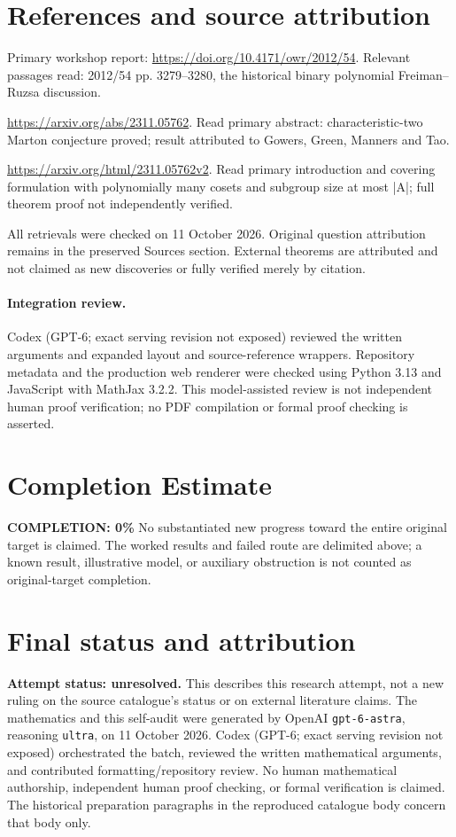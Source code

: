 \documentclass[11pt]{article}
\begin{document}
\section{References and source attribution}
Primary workshop report: \url{https://doi.org/10.4171/owr/2012/54}. Relevant passages read: 2012/54 pp. 3279--3280, the historical binary polynomial Freiman--Ruzsa discussion.

\url{https://arxiv.org/abs/2311.05762}. Read primary abstract: characteristic-two Marton conjecture proved; result attributed to Gowers, Green, Manners and Tao.

\url{https://arxiv.org/html/2311.05762v2}. Read primary introduction and covering formulation with polynomially many cosets and subgroup size at most |A|; full theorem proof not independently verified.

All retrievals were checked on 11 October 2026. Original question attribution remains in the preserved Sources section. External theorems are attributed and not claimed as new discoveries or fully verified merely by citation.


\paragraph{Integration review.} Codex (GPT-6; exact serving revision not exposed) reviewed the written arguments and expanded layout and source-reference wrappers. Repository metadata and the production web renderer were checked using Python 3.13 and JavaScript with MathJax 3.2.2. This model-assisted review is not independent human proof verification; no PDF compilation or formal proof checking is asserted.

\section{Completion Estimate}
\noindent\textbf{COMPLETION: 0\%}
No substantiated new progress toward the entire original target is claimed. The worked results and failed route are delimited above; a known result, illustrative model, or auxiliary obstruction is not counted as original-target completion.

\section{Final status and attribution}
\textbf{Attempt status: unresolved.} This describes this research attempt, not a new ruling on the source catalogue's status or on external literature claims.
The mathematics and this self-audit were generated by OpenAI \texttt{gpt-6-astra}, reasoning \texttt{ultra}, on 11 October 2026. Codex (GPT-6; exact serving revision not exposed) orchestrated the batch, reviewed the written mathematical arguments, and contributed formatting/repository review. No human mathematical authorship, independent human proof checking, or formal verification is claimed. The historical preparation paragraphs in the reproduced catalogue body concern that body only.
\end{document}
